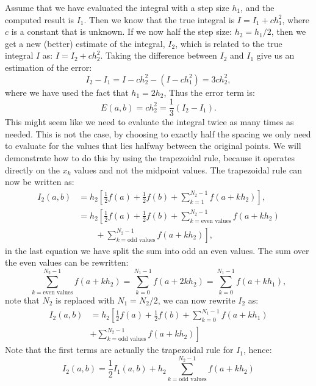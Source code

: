 \documentclass[graybox,sectrefs,envcountresetchap,open=right,final]{svmonodo}
\begin{document}
Assume that we have evaluated the integral with a step size $h_1$, and the computed result is $I_1$. 
Then we know that the true integral is $I=I_1+c h_1^2$, where $c$ is a constant that is unknown. If we now half the step size: $h_2=h_1/2$, 
then we get a new (better) estimate of the integral, $I_2$, which is related to the true integral $I$ as: $I=I_2+c h_2^2$. 
Taking the difference between $I_2$ and $I_1$ give us an estimation of the error:
\begin{equation}
I_2-I_1=I-c h_2^2-(I-ch_1^2)=3c h_2^2,
\end{equation}
where we have used the fact that $h_1=2h_2$, Thus the error term is:
\begin{equation}
E(a,b)=c h_2^2=\frac{1}{3}(I_2-I_1).
\end{equation}
This might seem like we need to evaluate the integral twice as many times as needed. This is not the case, by choosing to exactly 
half the spacing we only need to evaluate for the values that lies halfway between the original points. We will demonstrate how 
to do this by using the trapezoidal rule, because it operates directly on the $x_k$ values and not the midpoint values. 
The trapezoidal rule can now be written as:
\begin{align}
I_2(a,b)&=h_2\left[\frac{1}{2}f(a)+\frac{1}{2}f(b)+\sum_{k=1}^{N_2-1}f(a+k h_2)\right],\\ 
&=h_2\left[\frac{1}{2}f(a)+\frac{1}{2}f(b)+\sum_{k=\text{even values}}^{N_2-1}f(a+k h_2)\right.\nonumber\\ 
&\left.\qquad+\sum_{k=\text{odd values}}^{N_2-1}f(a+k h_2)\right],
\end{align}
in the last equation we have split the sum into odd an even values. The sum over the even values can be rewritten:
\begin{equation}
\sum_{k=\text{even values}}^{N_2-1}f(a+k h_2)=\sum_{k=0}^{N_1-1}f(a+2k h_2)=\sum_{k=0}^{N_1-1}f(a+k h_1),
\end{equation}
note that $N_2$ is replaced with $N_1=N_2/2$, we can now rewrite $I_2$ as:
\begin{align}
I_2(a,b)&=h_2\left[\frac{1}{2}f(a)+\frac{1}{2}f(b)+\sum_{k=0}^{N_1-1}f(a+k h_1)\right.\nonumber\\ 
&\left.+\sum_{k=\text{odd values}}^{N_2-1}f(a+k h_2)\right]
\end{align}
Note that the first terms are actually the trapezoidal rule for $I_1$, hence:
\begin{equation}
I_2(a,b)=\frac{1}{2}I_1(a,b)+h_2\sum_{k=\text{odd values}}^{N_2-1}f(a+k h_2)
\end{equation}
\end{document}
